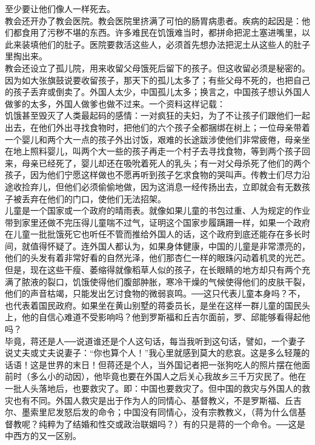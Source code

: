 至少要让他们像人一样死去。\\

教会还开办了教会医院。教会医院里挤满了可怕的肠胃病患者。疾病的起因是：他们都食用了污秽不堪的东西。许多难民在饥饿难当时，都拼命把泥土塞进嘴里，以此来装填他们的肚子。医院要救活这些人，必须首先想办法把泥土从这些人的肚子里掏出来。\\

教会还设立了孤儿院，用来收留父母饿死后留下的孩子。但这收留必须是秘密的。因为如大张旗鼓说要收留孩子，那天下的孤儿太多了；有些父母不死的，也把自己的孩子丢弃或倒卖了。外国人太少，中国孤儿太多；换言之，中国孩子想认外国人做爹的太多，外国人做爹也做不过来。一个资料这样记载：\\

饥饿甚至毁灭了人类最起码的感情：一对疯狂的夫妇，为了不让孩子们跟他们一起出去，在他们外出寻找食物时，把他们的六个孩子全都捆绑在树上；一位母亲带着一个婴儿和两个大一点的孩子外出讨饭，艰难的长途跋涉使他们非常疲倦，母亲坐在地上照料婴儿，叫两个大一些的孩子再走一个村子去寻找食物，等到两个孩子回来，母亲已经死了，婴儿却还在吸吮着死人的乳头；有一对父母杀死了他们的两个孩子，因为他们宁愿这样做也不愿再听到孩子乞求食物的哭叫声。传教士们尽力沿途收捡弃儿，但他们必须偷偷地做，因为这消息一经传扬出去，立即就会有无数孩子被丢弃在他们的门口，使他们无法招架。\\

儿童是一个国家或一个政府的晴雨表。就像如果儿童的书包过重、人为规定的作业带到家里还做不完压得儿童喘不过气，证明这个国家步履蹒跚一样，如果一个政府在儿童一批批饿死它也听任不管而推给外国人的话，这个政府到底还能存在多长时间，就值得怀疑了。连外国人都认为，如果身体健康，中国的儿童是非常漂亮的，他们的头发有着非常好看的自然光泽，他们那杏仁一样的眼珠闪动着机灵的光芒。但是，现在这些干瘦、萎缩得就像稻草人似的孩子，在长眼睛的地方却只有两个充满了脓液的裂口，饥饿使得他们腹部肿胀，寒冷干燥的气候使得他们的皮肤干裂，他们的声音枯竭，只能发出乞讨食物的微弱哀鸣。──这只代表儿童本身吗？不，也代表着国民政府。如果坐在黄山别墅的蒋委员长，是坐在这样一群儿童的国民头上，他的自信心难道不受影响吗？他到罗斯福和丘吉尔面前，罗、邱能够看得起他吗？\\

毕竟，蒋还是人──说道谁还是个人这句话，每当我听到这句话，譬如，一个妻子说丈夫或丈夫说妻子：“你也算个人！”我心里就感到莫大的悲哀。这是多么轻蔑的话语！这是世界的末日！但蒋还是个人，当外国记者把一张狗吃人的照片摆在他面前时（多么小的动因），他毕竟也要在外国人之后关心我故乡三千万灾民了。他在一批人头落地后，也要救灾了。即：中国也要救灾了。但中国的救灾与外国人的救灾也有不同。外国人救灾是出于作为人的同情心、基督教义，不是罗斯福、丘吉尔、墨索里尼发怒后发的命令；中国没有同情心，没有宗教教义，（蒋为什么信基督教呢？纯粹为了结婚和性交或政治联姻吗？）有的只是蒋的一个命令。──这是中西方的又一区别。\\

